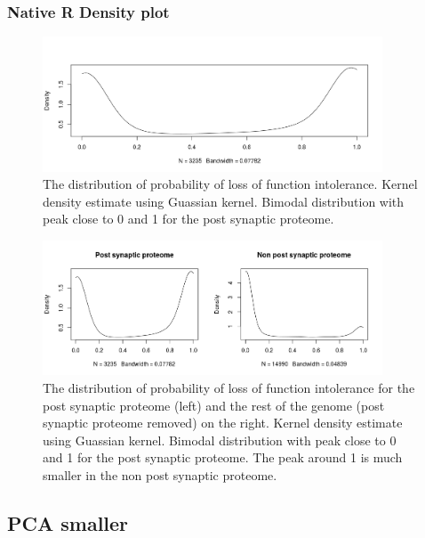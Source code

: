 \subsubsection{Native R Density plot}

\begin{figure}
    \centering
    \includegraphics[width=0.9\textwidth]{images/Rplot_kernel_density.png}
    \caption{The distribution of probability of loss of function intolerance. Kernel density estimate using Guassian kernel. Bimodal distribution with peak close to 0 and 1 for the post synaptic proteome. }
    \label{fig:density estimate pLi}
\end{figure}

\begin{figure}
    \centering
    \includegraphics[width=0.9\textwidth]{images/Rplot01_density_PSP_two_panel_nonPSP.png}
    \caption{The distribution of probability of loss of function intolerance for the post synaptic proteome (left) and the rest of the genome (post synaptic proteome removed) on the right. Kernel density estimate using Guassian kernel. Bimodal distribution with peak close to 0 and 1 for the post synaptic proteome. The peak around 1 is much smaller in the non post synaptic proteome. }
    \label{fig:density estimate pLi two panel}
\end{figure}
\subsection{PCA smaller}

